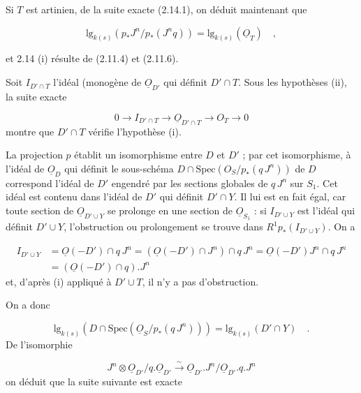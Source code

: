 Si $T$ est artinien, de la suite exacte (2.14.1), on déduit maintenant que

\begin{equation*}
\mathrm{lg}_{k(s)} (p_*J^n/p_*(J^nq)) = \mathrm{lg}_{k(s)} (\underline{O}_T) \quad , 
\end{equation*}


 et 2.14 (i) résulte de (2.11.4) et (2.11.6).

Soit $I_{D'\cap T}$ l'idéal (monogène de $\underline{O}_{D'}$ qui définit $D'\cap T$. Sous les hypothèses (ii), la suite exacte

\begin{equation*}
0 \longrightarrow I_{D'\cap T} \longrightarrow \underline{O}_{D'\cap T} \longrightarrow O_T \longrightarrow 0
\end{equation*}
montre que $D'\cap T$ vérifie l'hypothèse (i).

La projection $p$ établit un isomorphisme entre $D$ et $D'$ ; par cet isomorphisme, à l'idéal de $\underline{O}_D$ qui définit le sous-schéma $D \cap \mathrm{Spec}(O_S/p_*(q\,J^n))$ de $D$ correspond l'idéal de $D'$ engendré par les sections globales de $q\,J^n$ sur $S_1$. Cet idéal est contenu dans l'idéal de $D'$ qui définit $D'\cap Y$. Il lui est en fait égal, car toute section de $\underline{O}_{D'\cup Y}$ se prolonge en une section de $\underline{O}_{S_1}$ : si $I_{D'\cup Y}$ est l'idéal qui définit $D'\cup Y$, l'obstruction ou prolongement se trouve dans $R^1p_*(I_{D'\cup Y})$. On a

\begin{equation*}
\begin{array}{rl} I_{D'\cup Y} & = \underline{O}(-D')\cap q\,J^n = (\underline{O}(-D')\cap J^n) \cap q\,J^n = \underline{O}(-D')J^n \cap q\,J^n \\[2mm] & = (\underline{O}(-D')\cap q). J^n \end{array}
\end{equation*}
et, d'après (i) appliqué à $D'\cup T$, il n'y a pas d'obstruction.

On a donc

\begin{equation}\tag{2.14.2}
\mathrm{lg}_{k(s)} (D\cap \mathrm{Spec}(\underline{O}_S/p_*(q\,J^n))) = \mathrm{lg}_{k(s)} (D'\cap Y) \quad .
\end{equation}
De l'isomorphie

\begin{equation*}
J^n \otimes \underline{O}_{D'}/q.\underline{O}_{D'} \stackrel{\sim}{\longrightarrow} \underline{O}_{D'}.J^n/\underline{O}_{D'}.q.J^n
\end{equation*}
on déduit que la suite suivante est exacte


